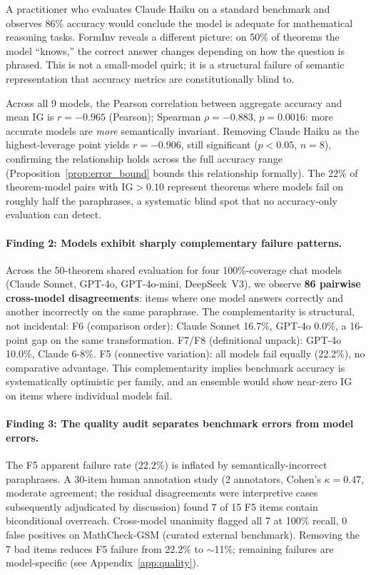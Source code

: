 \documentclass{article}
\begin{document}
A practitioner who evaluates Claude Haiku on a standard benchmark and observes 86\%
accuracy would conclude the model is adequate for mathematical reasoning tasks.
FormInv reveals a different picture: on 50\% of theorems the model ``knows,''
the correct answer changes depending on how the question is phrased.
This is not a small-model quirk; it is a structural failure of semantic representation
that accuracy metrics are constitutionally blind to.

Across all 9 models, the Pearson correlation between aggregate accuracy and mean IG
is $r = -0.965$ (Pearson); Spearman $\rho = -0.883$, $p = 0.0016$: more accurate models are
\emph{more} semantically invariant.
Removing Claude Haiku as the highest-leverage point yields $r = -0.906$, still significant
($p < 0.05$, $n = 8$), confirming the relationship holds across the full accuracy range
(Proposition~\ref{prop:error_bound} bounds this relationship formally).
The 22\% of theorem-model pairs with $\mathrm{IG} > 0.10$ represent theorems where
models fail on roughly half the paraphrases, a systematic blind spot that no
accuracy-only evaluation can detect.

\paragraph{Finding 2: Models exhibit sharply complementary failure patterns.}
Across the 50-theorem shared evaluation for four 100\%-coverage chat models
(Claude Sonnet, GPT-4o, GPT-4o-mini, DeepSeek~V3), we observe \textbf{86 pairwise cross-model disagreements}:
items where one model answers correctly and another incorrectly on the same paraphrase.
The complementarity is structural, not incidental:
F6 (comparison order): Claude Sonnet 16.7\%, GPT-4o 0.0\%,
a 16-point gap on the same transformation.
F7/F8 (definitional unpack): GPT-4o 10.0\%, Claude 6-8\%.
F5 (connective variation): all models fail equally (22.2\%), no comparative advantage.
This complementarity implies benchmark accuracy is systematically optimistic per family,
and an ensemble would show near-zero IG on items where individual models fail.


\paragraph{Finding 3: The quality audit separates benchmark errors from model errors.}
The F5 apparent failure rate (22.2\%) is inflated by semantically-incorrect paraphrases.
A 30-item human annotation study (2 annotators, Cohen's $\kappa = 0.47$, moderate agreement; the residual disagreements were interpretive cases subsequently adjudicated by discussion) found 7 of 15 F5 items contain biconditional overreach.
Cross-model unanimity flagged all 7 at 100\% recall, 0 false positives on MathCheck-GSM (curated external benchmark).
Removing the 7 bad items reduces F5 failure from 22.2\% to $\sim$11\%; remaining failures are model-specific (see Appendix~\ref{app:quality}).
\end{document}
